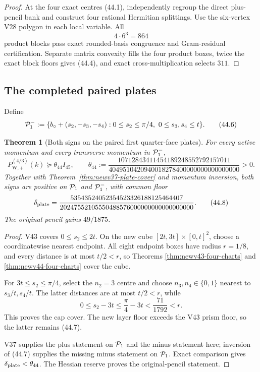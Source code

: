 \documentclass[11pt,oneside]{article}
\newtheorem{theorem}{Theorem}[section]
\theoremstyle{definition}
\theoremstyle{remark}
\begin{document}
\begin{proof}
At the four exact centres (44.1), independently regroup the direct
plus-pencil bank and construct four rational Hermitian splittings.
Use the six-vertex V28 polygon in each local variable.  All
\[
 4\cdot6^3=864                                         \tag{44.5}
\]
product blocks pass exact rounded-basis congruence and Gram-residual
certification.  Separate matrix convexity fills the four product
boxes, twice the exact block floors gives (44.4), and exact
cross-multiplication selects \(311\).
\end{proof}

\subsection{The completed paired plates}

Define
\[
 {\cal P}_{1}^{-}:=
 \{b_\circ+(s_2,-s_3,-s_4):
       0\le s_2\le\pi/4,\ 0\le s_3,s_4\le t\}.         \tag{44.6}
\]

\begin{theorem}[Both signs on the paired first quarter-face plates]
\label{thm:newv44-paired-plates}
For every active momentum and every transverse momentum in
\({\cal P}_1^-\),
\[
 P_{\mathrm W,+}^{(4/3)}(k)
 \succeq\theta_{44}I_{45},\qquad
 \theta_{44}:=
 \frac{10712843411454189248552792157011}
 {4049510420940018278400000000000000000}>0.            \tag{44.7}
\]
Together with Theorem~\ref{thm:newv37-plate-cover} and momentum
inversion, both signs are positive on \({\cal P}_1\) and
\({\cal P}_1^-\), with common floor
\[
 \delta_{\rm plate}
 =\frac{53543524052354523326188125464407}
 {20247552105550488576000000000000000000}.             \tag{44.8}
\]
The original pencil gains \(49/1875\).
\end{theorem}

\begin{proof}
V43 covers \(0\le s_2\le2t\).  On the new cube
\([2t,3t]\times[0,t]^2\), choose a coordinatewise nearest endpoint.
All eight endpoint boxes have radius \(r=1/8\), and every distance
is at most \(t/2<r\), so Theorems
\ref{thm:newv43-four-charts} and
\ref{thm:newv44-four-charts} cover the cube.

For \(3t\le s_2\le\pi/4\), select the \(n_2=3\) centre and choose
\(n_3,n_4\in\{0,1\}\) nearest to \(s_3/t,s_4/t\).  The latter
distances are at most \(t/2<r\), while
\[
 0\le s_2-3t\le\frac{\pi}{4}-3t
 <\frac{71}{1792}<r.                                   \tag{44.9}
\]
This proves the cap cover.  The new layer floor exceeds the V43
prism floor, so the latter remains (44.7).

V37 supplies the plus statement on \({\cal P}_1\) and the minus
statement here; inversion of (44.7) supplies the missing minus
statement on \({\cal P}_1\).  Exact comparison gives
\(\delta_{\rm plate}<\theta_{44}\).  The Hessian reserve proves the
original-pencil statement.
\end{proof}
\end{document}
